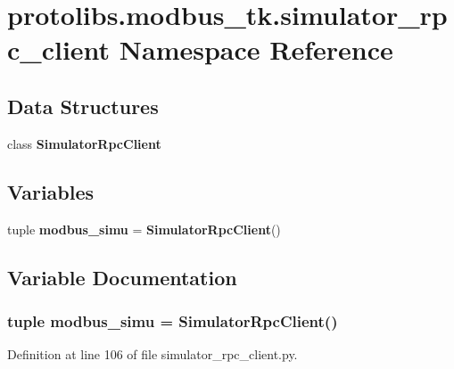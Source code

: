 \section{protolibs.\+modbus\+\_\+tk.\+simulator\+\_\+rpc\+\_\+client Namespace Reference}
\label{namespaceprotolibs_1_1modbus__tk_1_1simulator__rpc__client}
\subsection*{Data Structures}
\begin{DoxyCompactItemize}
\item 
class {\bf Simulator\+Rpc\+Client}
\end{DoxyCompactItemize}
\subsection*{Variables}
\begin{DoxyCompactItemize}
\item 
tuple {\bf modbus\+\_\+simu} = {\bf Simulator\+Rpc\+Client}()
\end{DoxyCompactItemize}


\subsection{Variable Documentation}
\subsubsection[{modbus\+\_\+simu}]{\setlength{\rightskip}{0pt plus 5cm}tuple modbus\+\_\+simu = {\bf Simulator\+Rpc\+Client}()}\label{namespaceprotolibs_1_1modbus__tk_1_1simulator__rpc__client_a4dadfb4e9a17313431bb309f5f976d71}


Definition at line 106 of file simulator\+\_\+rpc\+\_\+client.\+py.

